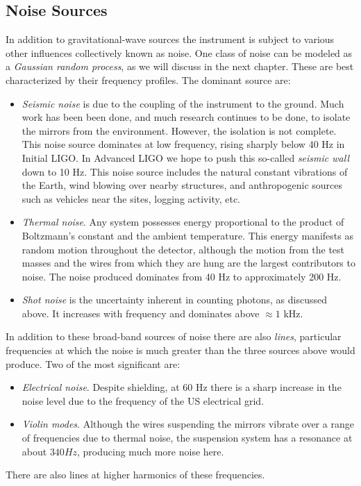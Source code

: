 \subsection{Noise Sources}
\label{sec:noise_sources}

In addition to gravitational-wave sources the instrument is subject to
various other influences collectively known as noise.  One class of
noise can be modeled as a \emph{Gaussian random process}, as we will
discuss in the next chapter.  These are best characterized by their
frequency profiles.  The dominant source are:
%
\begin{itemize} 
\item \emph{Seismic noise} is due to the coupling of the
instrument to the ground.  Much work has been been done, and much
research continues to be done, to isolate the mirrors from the
environment.  However, the isolation is not complete.  This noise
source dominates at low frequency, rising sharply below 40 Hz in
Initial LIGO.  In Advanced LIGO we hope to push this so-called
\emph{seismic wall} down to 10 Hz.  This noise source includes the
natural constant vibrations of the Earth, wind blowing over nearby
structures, and anthropogenic sources such as vehicles near the sites,
logging activity, etc.

\item \emph{Thermal noise}. Any system possesses energy proportional
to the product of Boltzmann's constant and the ambient temperature.
This energy manifests as random motion throughout the detector,
although the motion from the test masses and the wires from which they
are hung are the largest contributors to noise.  The noise produced
dominates from 40 Hz to approximately 200 Hz.

\item \emph{Shot noise} is the uncertainty inherent in counting
photons, as discussed above.  It increases with frequency and
dominates above $\approx 1$ kHz.

\end{itemize}
%
In addition to these broad-band sources of noise there are also
\emph{lines}, particular frequencies at which the noise is much
greater than the three sources above would produce.  Two of the most
significant are:
%
\begin{itemize}
\item \emph{Electrical noise}.  Despite shielding, at 60 Hz there is a
sharp increase in the noise level due to the frequency of the US
electrical grid.
\item \emph{Violin modes}.  Although the wires suspending the mirrors
vibrate over a range of frequencies due to thermal noise, the
suspension system has a resonance at about $340 Hz$, producing much
more noise here.
\end{itemize}
%
There are also lines at higher harmonics of these frequencies.

